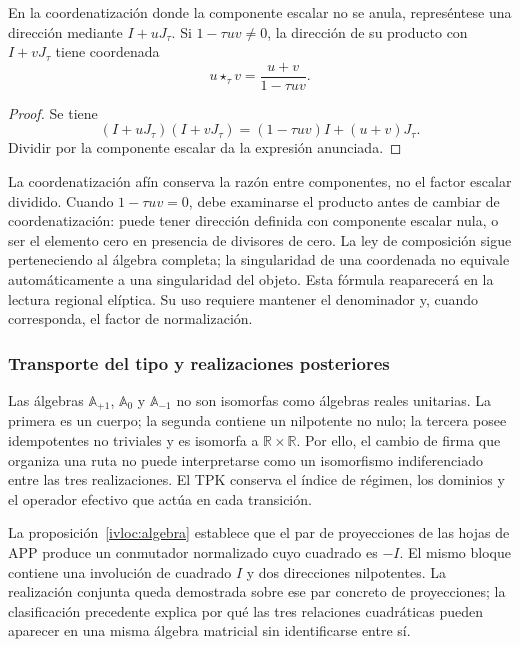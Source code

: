 \begin{proposition}
\label{trit-ampl-prop-pendientes}
En la coordenatización donde la componente escalar no se anula, represéntese una
dirección mediante \(I+uJ_\tau\). Si \(1-\tau uv\ne0\), la dirección de su
producto con \(I+vJ_\tau\) tiene coordenada
\[
 u\star_\tau v=\frac{u+v}{1-\tau uv}.
\]
\end{proposition}
\begin{proof}
Se tiene
\[
 (I+uJ_\tau)(I+vJ_\tau)
   =(1-\tau uv)I+(u+v)J_\tau.
\]
Dividir por la componente escalar da la expresión anunciada.
\end{proof}

La coordenatización afín conserva la razón entre componentes, no el factor escalar
dividido. Cuando \(1-\tau uv=0\), debe examinarse el producto antes de
cambiar de coordenatización: puede tener dirección definida con componente escalar
nula, o ser el elemento cero en presencia de divisores de cero. La ley de
composición sigue perteneciendo al álgebra completa; la singularidad de
una coordenada no equivale automáticamente a una singularidad del objeto.
Esta fórmula reaparecerá en la lectura regional elíptica. Su uso requiere
mantener el denominador y, cuando corresponda, el factor de normalización.

\subsubsection{Transporte del tipo y realizaciones posteriores}
\label{trit-ampl-puentes}

Las álgebras \(\mathbb A_{+1}\), \(\mathbb A_0\) y
\(\mathbb A_{-1}\) no son isomorfas como álgebras reales unitarias.
La primera es un cuerpo; la segunda contiene un nilpotente no nulo; la
tercera posee idempotentes no triviales y es isomorfa a
\(\mathbb R\times\mathbb R\). Por ello, el cambio de firma que organiza una
ruta no puede interpretarse como un isomorfismo indiferenciado entre las
tres realizaciones. El TPK conserva el índice de régimen, los dominios y el
operador efectivo que actúa en cada transición.



La proposición~\ref{ivloc:algebra} establece que el par de proyecciones de las hojas de APP
produce un conmutador normalizado cuyo cuadrado es \(-I\). El mismo bloque
contiene una involución de cuadrado \(I\) y dos direcciones nilpotentes. La
realización conjunta queda demostrada sobre ese par concreto de proyecciones;
la clasificación precedente explica por qué las tres relaciones cuadráticas
pueden aparecer en una misma álgebra matricial sin identificarse entre sí.

